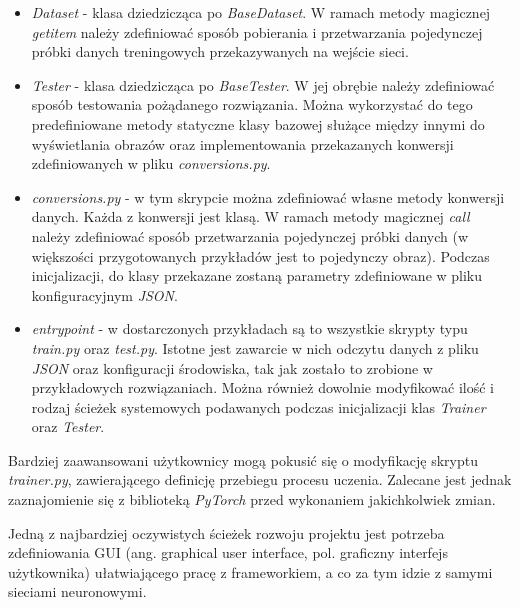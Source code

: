   \begin{itemize}
  \item \textit{Dataset} - klasa dziedzicząca po \textit{BaseDataset}. W ramach
  metody magicznej \textit{getitem} należy zdefiniować sposób pobierania i przetwarzania
  pojedynczej próbki danych treningowych przekazywanych na wejście sieci.

  \item \textit{Tester} - klasa dziedzicząca po \textit{BaseTester}. W jej obrębie
  należy zdefiniować sposób testowania pożądanego rozwiązania. Można wykorzystać
  do tego predefiniowane metody statyczne klasy bazowej służące między innymi
  do wyświetlania obrazów oraz implementowania przekazanych konwersji zdefiniowanych
  w pliku \textit{conversions.py}.

  \item \textit{conversions.py} - w tym skrypcie można zdefiniować własne metody
  konwersji danych. Każda z konwersji jest klasą. W ramach metody magicznej \textit{call}
  należy zdefiniować sposób przetwarzania pojedynczej próbki danych (w większości
  przygotowanych przykładów jest to pojedynczy obraz). Podczas inicjalizacji,
  do klasy przekazane zostaną parametry zdefiniowane w pliku konfiguracyjnym
  \textit{JSON}.

  \item \textit{entrypoint} - w dostarczonych przykładach są to wszystkie
  skrypty typu \textit{train.py} oraz \textit{test.py}. Istotne jest
  zawarcie w nich odczytu danych z pliku \textit{JSON} oraz konfiguracji środowiska, tak
  jak zostało to zrobione w przykładowych rozwiązaniach. Można również dowolnie
  modyfikować ilość i rodzaj ścieżek systemowych podawanych podczas inicjalizacji
  klas \textit{Trainer} oraz \textit{Tester}.
  \end{itemize}

  Bardziej zaawansowani użytkownicy mogą pokusić się o modyfikację skryptu
  \textit{trainer.py}, zawierającego definicję przebiegu procesu uczenia.
  Zalecane jest jednak zaznajomienie się z biblioteką \textit{PyTorch} przed wykonaniem
  jakichkolwiek zmian.

  Jedną z najbardziej oczywistych ścieżek rozwoju projektu jest
  potrzeba zdefiniowania GUI (ang. graphical user interface, pol. graficzny interfejs użytkownika) ułatwiającego pracę z frameworkiem, a co
  za tym idzie z samymi sieciami neuronowymi.
